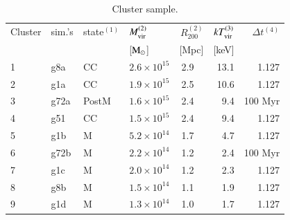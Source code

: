 \documentclass[useAMS,usenatbib]{mn2e}
\newcommand{\rvir}{R_{200}}
\begin{document}
\begin{table}
\caption{Cluster sample.}
\begin{tabular}{l l l l r r r}
\hline
\hline
Cluster & sim.'s & state$^{(1)}$ & $M_{\rm vir}^{(2)}$ & $\rvir^{(2)}$ & $kT_{\rm vir}^{(3)}$ & $\Delta t$$^{(4)}$\\
& & & [${\mathrm{M}}_\odot$] & [Mpc] & [keV] & \\
\hline
1  & g8a  & CC    & $2.6\times 10^{15}$ &   2.9~~ & 13.1 & 1.127 \\
2  & g1a  & CC    & $1.9\times 10^{15}$ &   2.5~~ & 10.6 & 1.127 \\
3  & g72a & PostM & $1.6\times 10^{15}$ &   2.4~~ & 9.4  & 100 Myr \\
4  & g51  & CC    & $1.5\times 10^{15}$ &   2.4~~ & 9.4  & 1.127 \\
                                                     
5  & g1b  & M     & $5.2\times 10^{14}$ &   1.7~~ & 4.7  & 1.127 \\
6  & g72b & M     & $2.2\times 10^{14}$ &   1.2~~ & 2.4  & 100 Myr \\
7  & g1c  & M     & $2.0\times 10^{14}$ &   1.2~~ & 2.3  & 1.127 \\
8  & g8b  & M     & $1.5\times 10^{14}$ &   1.1~~ & 1.9  & 1.127 \\
9  & g1d  & M     & $1.3\times 10^{14}$ &   1.0~~ & 1.7  & 1.127 \\
                                                     

\end{tabular}
\end{table}
\end{document}
